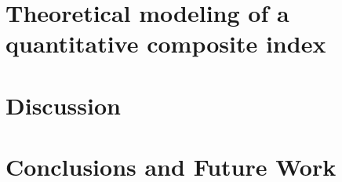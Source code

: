 \documentclass{llncs}
\begin{document}
\section{Theoretical modeling of a quantitative composite index}

\section{Discussion}

\section{Conclusions and Future Work}




\appendix
\clearpage





\end{document}
